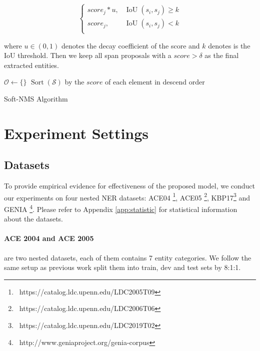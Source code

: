 \documentclass[11pt,a4paper]{article}
\begin{document}
\begin{equation}
\left\{
            \begin{array}{lr}
             score_j * u, &  \operatorname{IoU}(s_i,s_j)\geq k \\
             score_j, & \operatorname{IoU}(s_i,s_j)<k\\
             \end{array}
\right.
\end{equation}

\noindent where $u\in(0, 1)$ denotes the decay coefficient of the score and $k$ denotes is the IoU threshold. Then we keep all span proposals with a $score > \delta$ as the final extracted entities.


\begin{algorithm}[]
 $\mathcal{O} \leftarrow \{\}$\;
 $\operatorname{Sort}( \mathcal{S} )$ by the $score$ of each element in descend order\;


 \caption{Soft-NMS Algorithm}
 \label{alg:sof-nms}
\end{algorithm}


\section{Experiment Settings}
\subsection{Datasets}



To provide empirical evidence for effectiveness of the proposed model, we conduct our experiments on four nested NER datasets: ACE04 \footnote{{\ https://catalog.ldc.upenn.edu/LDC2005T09}}, ACE05 \footnote{{\ https://catalog.ldc.upenn.edu/LDC2006T06}}, KBP17\footnote{{\ https://catalog.ldc.upenn.edu/LDC2019T02}} and GENIA \footnote{{\ http://www.geniaproject.org/genia-corpus}}. Please refer to Appendix \ref{app:statistic} for statistical information  about the datasets.


\paragraph{ACE 2004 and ACE 2005} \citep{doddington-etal-2004-automatic, 2005-automatic} are two nested datasets, each of them contains 7 entity categories. We follow the same setup as previous work \citet{katiyar-cardie-2018-nested, lin-etal-2019-sequence} split them into train, dev and test sets by 8:1:1.
\end{document}
